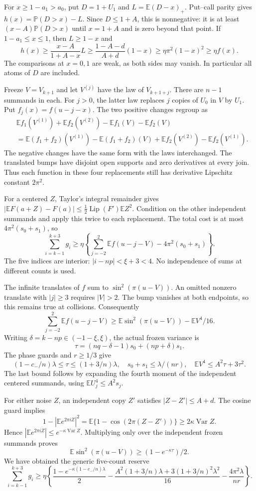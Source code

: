 \documentclass[11pt]{article}
\newcommand{\E}{\mathbb E}\newcommand{\Pp}{\mathbb P}
\begin{document}
For $x\ge1-a_1>a_0$, put $D=1+U_1$ and $L=\E(D-x)_+$.
Put--call parity gives $h(x)=\Pp(D>x)-L$. Since $D\le1+A$,
this is nonnegative: it is at least $(x-A)\Pp(D>x)$ until $x=1+A$
and is zero beyond that point. If $1-a_1\le x\le1$, then $L\ge1-x$ and
\[
h(x)\ge\frac{x-A}{1+A-x}L
\ge\frac{1-A-d}{A+d}(1-x)
\ge\eta\pi^2(1-x)^2\ge\eta f(x).
\]
The comparisons at $x=0,1$ are weak, as both sides may vanish.
In particular all atoms of $D$ are included.

Freeze $V=V_{k+1}$ and let $V^{(j)}$ have the law of $V_{k+1+j}$.
There are $n-1$ summands in each. For $j>0$, the latter law replaces
$j$ copies of $U_0$ in $V$ by $U_1$. Put $f_j(x)=f(u-j-x)$.
The two positive changes regroup as
\begin{align*}
&\E f_1(V^{(1)})+\E f_2(V^{(2)})-\E f_1(V)-\E f_2(V)\\
&=\E(f_1+f_2)(V^{(1)})-\E(f_1+f_2)(V)
 +\E f_2(V^{(2)})-\E f_2(V^{(1)}).
\end{align*}
The negative changes have the same form with the laws interchanged.
The translated bumps have disjoint open supports and zero derivatives at
every join. Thus each function in these four replacements still has
derivative Lipschitz constant $2\pi^2$.

For a centered $Z$, Taylor's integral remainder gives
$|\E F(a+Z)-F(a)|\le\frac12\operatorname{Lip}(F')\E Z^2$.
Condition on the other independent summands and apply this twice to each
replacement. The total cost is at most $4\pi^2(s_0+s_1)$, so
\[
\sum_{i=k-1}^{k+3}g_i
\ge\eta\left\{\sum_{j=-2}^2\E f(u-j-V)-4\pi^2(s_0+s_1)\right\}.
\]
The five indices are interior: $|i-np|<\xi+3<4$.
No independence of sums at different counts is used.

The infinite translates of $f$ sum to $\sin^2(\pi(u-V))$.
An omitted nonzero translate with $|j|\ge3$ requires $|V|>2$.
The bump vanishes at both endpoints, so this remains true at collisions.
Consequently
\[
\sum_{j=-2}^2\E f(u-j-V)
\ge \E\sin^2(\pi(u-V))-\E V^4/16.
\]
Writing $\delta=k-np\in(-1-\xi,\xi)$, the actual frozen variance is
\[
\tau=(nq-\delta-1)s_0+(np+\delta)s_1.
\]
The phase guards and $r\ge1/3$ give
\[
(1-c_-/n)\lambda\le\tau\le(1+3/n)\lambda,\quad
s_0+s_1\le\lambda/(nr),\quad
\E V^4\le A^2\tau+3\tau^2.
\]
The last bound follows by expanding the fourth moment of the independent
centered summands, using $\E U_j^4\le A^2s_j$.

For either noise $Z$, an independent copy $Z'$ satisfies
$|Z-Z'|\le A+d$. The cosine guard implies
\[
1-|\E e^{2\pi iZ}|^2
=\E\{1-\cos(2\pi(Z-Z'))\}\ge2\kappa\operatorname{Var}Z.
\]
Hence $|\E e^{2\pi iZ}|\le e^{-\kappa\operatorname{Var}Z}$.
Multiplying only over the independent frozen summands proves
\[
\E\sin^2(\pi(u-V))\ge(1-e^{-\kappa\tau})/2.
\]
We have obtained the generic five-count reserve
\begin{equation}\label{eq:reserve}
\sum_{i=k-1}^{k+3}g_i\ge\eta\left\{
\frac{1-e^{-\kappa(1-c_-/n)\lambda}}2
-\frac{A^2(1+3/n)\lambda+3(1+3/n)^2\lambda^2}{16}
-\frac{4\pi^2\lambda}{nr}\right\}.
\end{equation}
\end{document}
